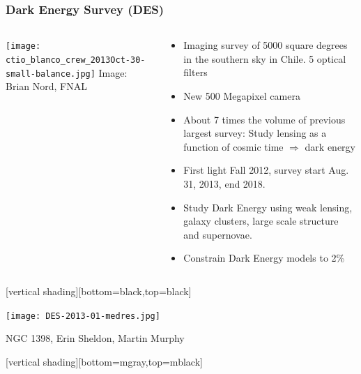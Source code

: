 \documentclass{beamer}
\begin{document}
\frame
{

    \frametitle{Dark Energy Survey (DES)}

    \fontsize{9}{0.8\baselineskip}

    \begin{columns}

        \begin{column}{0.4\textwidth}
            \texttt{[image: ctio\_blanco\_crew\_2013Oct-30-small-balance.jpg]}
            \newline
            \hfill {\tiny Image: Brian Nord, FNAL}
        \end{column}


        \begin{column}{0.6\textwidth}

            \begin{itemize}

                \item Imaging survey of 5000 square degrees in the southern
                    sky in Chile.  5 optical filters

                \item New 500 Megapixel camera

                \item About 7 times the volume of previous largest survey: Study lensing as a
                    function of {\color{gold}cosmic time $\Rightarrow$ dark
                    energy}

                \item First light Fall 2012, survey start Aug. 31, 2013, end 2018.

                \item Study Dark Energy using weak lensing, galaxy clusters,
                    large scale structure and supernovae.

                \item Constrain Dark Energy models to {\color{gold} 2\%}

            \end{itemize}

        \end{column}

    \end{columns}

}

{
    [vertical shading][bottom=black,top=black]
	
    \frame
    {

        \begin{center}
            \texttt{[image: DES-2013-01-medres.jpg]}

            {\tiny \hfill NGC 1398, Erin Sheldon, Martin Murphy}
        \end{center}
    }

    [vertical shading][bottom=mgray,top=mblack]

}
\end{document}

